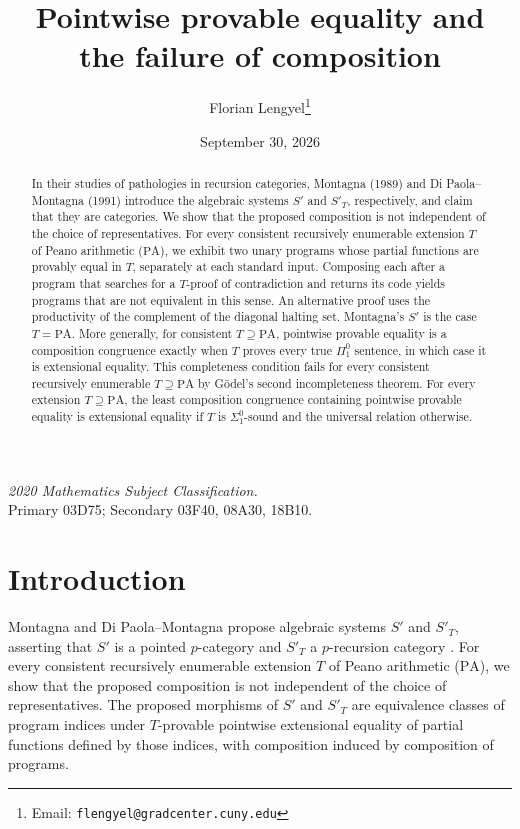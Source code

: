 \documentclass[11pt]{article}
\title{Pointwise provable equality and the failure of composition}
\author{Florian Lengyel\thanks{Email: \texttt{flengyel@gradcenter.cuny.edu}}}
\date{September 30, 2026}
\newcommand{\PA}{\mathrm{PA}}
\begin{document}
\maketitle

\begin{abstract}
In their studies of pathologies in recursion categories, Montagna (1989) and Di Paola--Montagna (1991) introduce the algebraic
systems $S'$ and $S'_T$, respectively, and claim that they are categories. We show that the proposed composition is not independent 
of the choice of representatives. For every consistent recursively enumerable extension $T$ of Peano arithmetic ($\mathrm{PA}$), 
we exhibit two unary programs whose partial functions are provably equal in $T$, separately at each standard input. Composing each after a 
program that searches for a $T$-proof of contradiction and returns its code yields programs that are not
equivalent in this sense. An alternative proof uses the productivity of the complement of the diagonal halting set. 
Montagna's $S'$ is the case $T=\mathrm{PA}$. More generally, for consistent $T\supseteq\mathrm{PA}$, pointwise provable 
equality is a composition congruence exactly when $T$ proves every true $\Pi^0_1$ sentence, in which case it 
is extensional equality. This completeness condition fails for every consistent recursively enumerable $T\supseteq\mathrm{PA}$ 
by G\"odel's second incompleteness theorem. For every extension $T\supseteq\mathrm{PA}$, the least composition congruence 
containing pointwise provable equality is extensional equality if $T$ is $\Sigma^0_1$-sound and the universal relation otherwise.
\end{abstract}

\noindent\textit{2020 Mathematics Subject Classification.}\\
Primary 03D75; Secondary 03F40, 08A30, 18B10.

\section{Introduction}\label{sec:introduction}

Montagna and Di Paola--Montagna propose algebraic systems $S'$ and
$S'_T$, asserting that $S'$ is a pointed $p$-category
\cite[pp.~106, 108]{Montagna} and $S'_T$ a $p$-recursion category
\cite[p.~646]{DiPaolaMontagna}.
For every consistent recursively enumerable extension $T$ of
Peano arithmetic ($\PA$), we show that the proposed composition is not
independent of the choice of representatives.
The proposed morphisms of $S'$ and $S'_T$ are equivalence classes
of program indices under $T$-provable pointwise extensional equality
of partial functions defined by those indices, with composition induced
by composition of programs.
\end{document}
